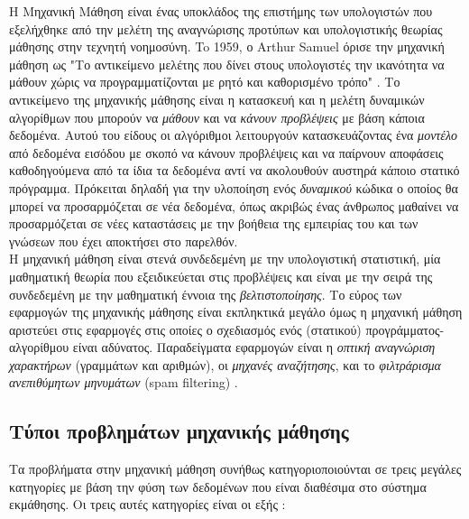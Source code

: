 \documentclass[11pt]{article} %
\numberwithin{equation}{subsection}
\begin{document}
Η Μηχανική Μάθηση είναι ένας υποκλάδος της επιστήμης των υπολογιστών που εξελήχθηκε από την μελέτη της αναγνώρισης προτύπων και υπολογιστικής θεωρίας μάθησης στην τεχνητή νοημοσύνη. To 1959, ο Arthur Samuel όρισε την μηχανική μάθηση ως "Το αντικείμενο μελέτης που δίνει στους υπολογιστές την ικανότητα να μάθουν χώρις να προγραμματίζονται με ρητό και καθορισμένο τρόπο" \cite{machinelearning2}. Το αντικείμενο της μηχανικής μάθησης είναι η κατασκευή και η μελέτη δυναμικών αλγορίθμων που μπορούν να \textit{μάθουν} και να \textit{κάνουν προβλέψεις} με βάση κάποια δεδομένα. Αυτού του είδους οι αλγόριθμοι λειτουργούν κατασκευάζοντας ένα \textit{μοντέλο} από δεδομένα εισόδου με σκοπό να κάνουν προβλέψεις και να παίρνουν αποφάσεις καθοδηγούμενα από τα ίδια τα δεδομένα αντί να ακολουθούν αυστηρά κάποιο στατικό πρόγραμμα. Πρόκειται δηλαδή για την υλοποίηση ενός \textit{δυναμικού} κώδικα ο οποίος θα μπορεί να προσαρμόζεται σε νέα δεδομένα, όπως ακριβώς ένας άνθρωπος μαθαίνει να προσαρμόζεται σε νέες καταστάσεις με την βοήθεια της εμπειρίας του και των γνώσεων που έχει αποκτήσει στο παρελθόν. \\

Η μηχανική μάθηση είναι στενά συνδεδεμένη με την υπολογιστική στατιστική, μία μαθηματική θεωρία που εξειδικεύεται στις προβλέψεις και είναι με την σειρά της συνδεδεμένη με την μαθηματική έννοια της \textit{βελτιστοποίησης}. Το εύρος των εφαρμογών της μηχανικής μάθησης είναι εκπληκτικά μεγάλο όμως η μηχανική μάθηση αριστεύει στις εφαρμογές στις οποίες ο σχεδιασμός ενός (στατικού) προγράμματος-αλγορίθμου είναι αδύνατος. Παραδείγματα εφαρμογών είναι η \textit{οπτική αναγνώριση χαρακτήρων} (γραμμάτων και αριθμών), οι \textit{μηχανές αναζήτησης}, και το  \textit{φιλτράρισμα ανεπιθύμητων μηνυμάτων} (spam filtering) \cite{machinelearning2}.\\

\subsection{Τύποι προβλημάτων μηχανικής μάθησης}
Τα προβλήματα στην μηχανική μάθηση συνήθως κατηγοριοποιούνται σε τρεις μεγάλες κατηγορίες με βάση την φύση των δεδομένων που είναι διαθέσιμα στο σύστημα εκμάθησης. Οι τρεις αυτές κατηγορίες είναι οι εξής \cite{machinelearning2}:\\
\end{document}
